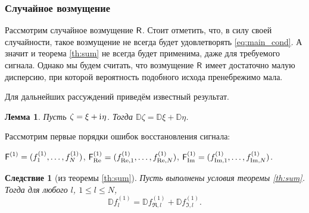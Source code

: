 \documentclass[specialist,
               substylefile = spbu.rtx,
               subf,href,colorlinks=true, 12pt]{disser}
\newtheorem*{notice*}{Замечание}
\newtheorem{lemma}{Лемма}
\newtheorem{corollary}{Следствие}
\DeclareMathOperator{\rk}{rk}
\begin{document}


\subsubsection{Случайное возмущение}

Рассмотрим случайное возмущение $\textsf{R}$. Стоит отметить, что, в силу своей случайности, такое возмущение не всегда будет удовлетворять \eqref{eq:main_cond}. А значит и теорема \ref{th:sum} не всегда будет применима, даже для требуемого сигнала. Однако мы будем считать, что возмущение $\textsf{R}$ имеет достаточно малую дисперсию, при которой вероятность подобного исхода пренебрежимо мала.

Для дальнейших рассуждений приведём известный результат.
\begin{lemma} \label{std:disp}
	Пусть $\zeta = \xi + \mathrm{i}\mkern1mu\eta$. Тогда $\mathbb{D}\zeta = \mathbb{D}\xi + \mathbb{D}\eta$.
\end{lemma}

Рассмотрим первые порядки ошибок восстановления сигнала:

$\textsf{F}^{(1)} = (f^{(1)}_1, \ldots, f^{(1)}_N)$, $\textsf{F}^{(1)}_{\Re} = (f^{(1)}_{\Re,1}, \ldots, f^{(1)}_{\Re, N})$, $\textsf{F}^{(1)}_{\Im} = (f^{(1)}_{\Im,1}, \ldots, f^{(1)}_{\Im, N})$.


\begin{corollary}[из теоремы {\ref{th:sum}}] \label{st:dispsum}
	Пусть выполнены условия теоремы \ref{th:sum}.
	Тогда для любого $l$, $1\le l \le N$,
	\begin{equation} \label{eq:dispsum}
		\mathbb{D}f^{(1)}_l = \mathbb{D}f^{(1)}_{\Re, l} + \mathbb{D}f^{(1)}_{\Im, l}.	
	\end{equation}
\end{corollary}
\end{document}
